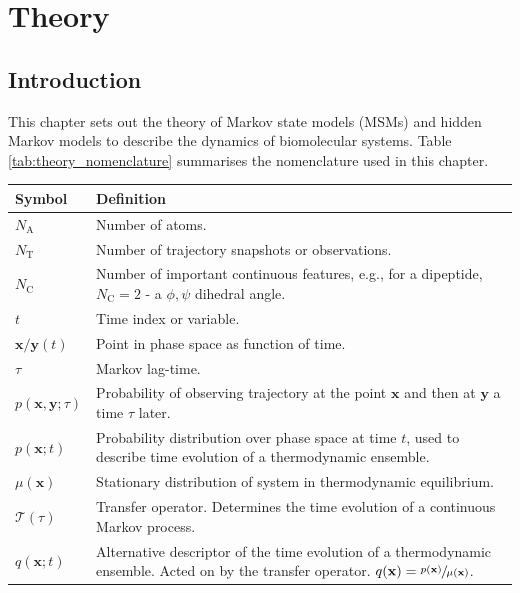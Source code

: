 %
\let\textcircled=\pgftextcircled
\chapter{Theory}
\label{chap:theory}

\section{Introduction}
This chapter sets out the theory of Markov state models (MSMs) and hidden Markov models to describe the dynamics of biomolecular systems. Table \ref{tab:theory_nomenclature} summarises the  nomenclature used in this chapter. 

\begin{table}
    \centering
    \begin{tabularx}{0.9\textwidth}{ |l| >{\raggedright\arraybackslash}X | } 
        \hline
        \textbf{Symbol}  &  \textbf{Definition} \\
        \hline\hline
        $N_{\mathrm{A}}$ & Number of atoms. \\
        $N_{\mathrm{T}}$ & Number of trajectory snapshots or observations. \\
        $N_{\mathrm{C}}$ & Number of important continuous features, e.g., for a dipeptide, $N_{\mathrm{C}}=2$ - a $\phi, \psi$ dihedral angle.  \\
        $t$ & Time index or variable. \\
        $\mathbf{x}/\mathbf{y}(t)$ & Point in phase space as function of time. \\
        $\tau$ & Markov lag-time. \\
        $p(\mathbf{x}, \mathbf{y}; \tau)$ & Probability of observing trajectory at the point $\mathbf{x}$ and then at $\mathbf{y}$ a time $\tau$ later. \\
        $p(\mathbf{x}; t)$ & Probability distribution over phase space at time $t$, used to describe time evolution of a thermodynamic ensemble. \\
        $\mu(\mathbf{x})$ & Stationary distribution of system in thermodynamic equilibrium.  \\ 
        $\mathcal{T}(\tau)$ & Transfer operator. Determines the time evolution of a continuous Markov process. \\
        $q(\mathbf{x}; t)$ & Alternative descriptor of the time evolution of a thermodynamic ensemble. Acted on by the transfer operator. $q(\mathbf{x}) = \sfrac{p(\mathbf{x})}{\mu(\mathbf{x})}$. \\

\end{tabularx}
\end{table}
